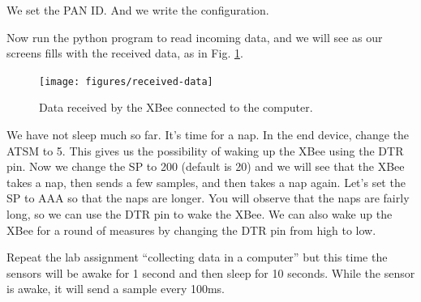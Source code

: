 We set the PAN ID.
And we write the configuration.

Now run the python program to read incoming data, and we will see as our screens fills with the received data, as in Fig. \ref{fig:received-data}.

\begin{figure}[htbp]
  \centering
  \texttt{[image: figures/received-data]}
  \caption{Data received by the XBee connected to the computer.}
  \label{fig:received-data}
\end{figure}

We have not sleep much so far.
It's time for a nap.
In the end device, change the ATSM to 5.
This gives us the possibility of waking up the XBee using the DTR pin.
Now we change the SP to 200 (default is 20) and we will see that the XBee takes a nap, then sends a few samples, and then takes a nap again.
Let's set the SP to AAA so that the naps are longer.
You will observe that the naps are fairly long, so we can use the DTR pin to wake the XBee.
We can also wake up the XBee for a round of measures by changing the DTR pin from high to low.

Repeat the lab assignment ``collecting data in a computer'' but this time the sensors will be awake for 1 second and then sleep for 10 seconds.
While the sensor is awake, it will send a sample every 100ms.

